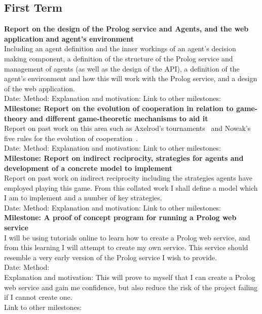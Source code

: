 \documentclass{article}
\begin{document}
\subsection*{First Term}

\textbf{Report on the design of the Prolog service and Agents, and the web application and agent's environment}\\
Including an agent definition and the inner workings of an agent's decision making component, a definition of the structure of the Prolog service and management of agents (as well as the design of the API), a definition of the agent's environment and how this will work with the Prolog service, and a design of the web application.\\
Date:
Method: 
Explanation and motivation:
Link to other milestones:\\

\noindent\textbf{Milestone: Report on the evolution of cooperation in relation to game-theory and different game-theoretic mechanisms to aid it}\\
Report on past work on this area such as Axelrod's tournaments~\cite{evolution_of_cooperation} and Nowak's five rules for the evolution of cooperation~\cite{five_rules_coop}.\\
Date:
Method: 
Explanation and motivation:
Link to other milestones:\\

\noindent\textbf{Milestone: Report on indirect reciprocity, strategies for agents and development of a concrete model to implement}\\
Report on past work on indirect reciprocity including the strategies agents have employed playing this game. From this collated work I shall define a model which I am to implement and a number of key strategies.\\
Date:
Method: 
Explanation and motivation:
Link to other milestones:\\

\noindent\textbf{Milestone: A proof of concept program for running a Prolog web service}\\
I will be using tutorials online to learn how to create a Prolog web service, and from this learning I will attempt to create my own service. This service should resemble a very early version of the Prolog service I wish to provide.\\
Date:
Method: \\
Explanation and motivation: This will prove to myself that I can create a Prolog web service and gain me confidence, but also reduce the risk of the project failing if I cannot create one.\\
Link to other milestones:\\
\end{document}
